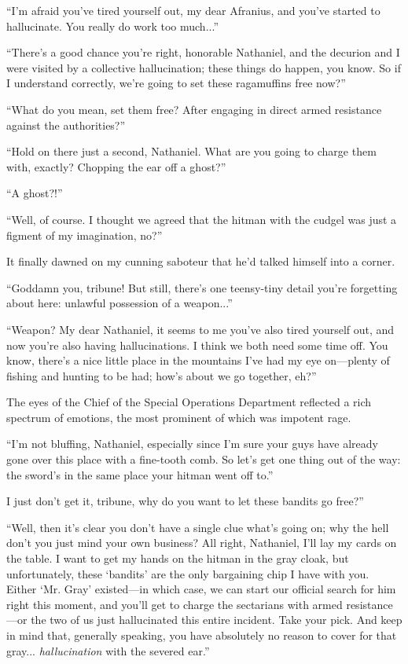 ``I'm afraid you've tired yourself out, my dear Afranius, and you've started to hallucinate. You really do work too much...''

``There's a good chance you're right, honorable Nathaniel, and the decurion and I were visited by a collective hallucination; these things do happen, you know. So if I understand correctly, we're going to set these ragamuffins free now?''

``What do you mean, set them free? After engaging in direct armed resistance against the authorities?''

``Hold on there just a second, Nathaniel. What are you going to charge them with, exactly? Chopping the ear off a ghost?''

``A ghost?!''

``Well, of course. I thought we agreed that the hitman with the cudgel was just a figment of my imagination, no?'' 

It finally dawned on my cunning saboteur that he'd talked himself into a corner.

``Goddamn you, tribune! But still, there's one teensy-tiny detail you're forgetting about here: unlawful possession of a weapon...''

``Weapon? My dear Nathaniel, it seems to me you've also tired yourself out, and now you're also having hallucinations. I think we both need some time off. You know, there's a nice little place in the mountains I've had my eye on---plenty of fishing and hunting to be had; how's about we go together, eh?'' 

The eyes of the Chief of the Special Operations Department reflected a rich spectrum of emotions, the most prominent of which was impotent rage.

``I'm not bluffing, Nathaniel, especially since I'm sure your guys have already gone over this place with a fine-tooth comb. So let's get one thing out of the way: the sword's in the same place your hitman went off to.''

I just don't get it, tribune, why do you want to let these bandits go free?''

``Well, then it's clear you don't have a single clue what's going on; why the hell don't you just mind your own business? All right, Nathaniel, I'll lay my cards on the table. I want to get my hands on the hitman in the gray cloak, but unfortunately, these `bandits' are the only bargaining chip I have with you. Either `Mr. Gray' existed---in which case, we can start our official search for him right this moment, and you'll get to charge the sectarians with armed resistance---or the two of us just hallucinated this entire incident. Take your pick. And keep in mind that, generally speaking, you have absolutely no reason to cover for that gray... \emph{hallucination} with the severed ear.''

